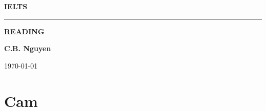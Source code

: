 \documentclass[11pt]{article}
\begin{document}
\begin{titlepage}
\centering
\phantom{}\par
\vspace{3cm}
{\LARGE\textbf{IELTS}\par}
\vspace{1cm}
\rule{5cm}{0.5pt}\par
\vspace{1cm}
{\LARGE\textbf{READING}\par}
\vspace{1cm}
\Large\textbf{C.B. Nguyen}\par		
\vspace{1cm}
\today
\end{titlepage}
\tableofcontents

\section{Cam}
\end{document}
